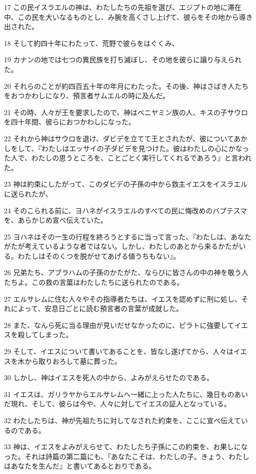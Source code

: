 \par 17 この民イスラエルの神は、わたしたちの先祖を選び、エジプトの地に滞在中、この民を大いなるものとし、み腕を高くさし上げて、彼らをその地から導き出された。
\par 18 そして約四十年にわたって、荒野で彼らをはぐくみ、
\par 19 カナンの地では七つの異民族を打ち滅ぼし、その地を彼らに譲り与えられた。
\par 20 それらのことが約四百五十年の年月にわたった。その後、神はさばき人たちをおつかわしになり、預言者サムエルの時に及んだ。
\par 21 その時、人々が王を要求したので、神はベニヤミン族の人、キスの子サウロを四十年間、彼らにおつかわしになった。
\par 22 それから神はサウロを退け、ダビデを立てて王とされたが、彼についてあかしをして、『わたしはエッサイの子ダビデを見つけた。彼はわたしの心にかなった人で、わたしの思うところを、ことごとく実行してくれるであろう』と言われた。
\par 23 神は約束にしたがって、このダビデの子孫の中から救主イエスをイスラエルに送られたが、
\par 24 そのこられる前に、ヨハネがイスラエルのすべての民に悔改めのバプテスマを、あらかじめ宣べ伝えていた。
\par 25 ヨハネはその一生の行程を終ろうとするに当って言った、『わたしは、あなたがたが考えているような者ではない。しかし、わたしのあとから来るかたがいる。わたしはそのくつを脱がせてあげる値うちもない』。
\par 26 兄弟たち、アブラハムの子孫のかたがた、ならびに皆さんの中の神を敬う人たちよ。この救の言葉はわたしたちに送られたのである。
\par 27 エルサレムに住む人々やその指導者たちは、イエスを認めずに刑に処し、それによって、安息日ごとに読む預言者の言葉が成就した。
\par 28 また、なんら死に当る理由が見いだせなかったのに、ピラトに強要してイエスを殺してしまった。
\par 29 そして、イエスについて書いてあることを、皆なし遂げてから、人々はイエスを木から取りおろして墓に葬った。
\par 30 しかし、神はイエスを死人の中から、よみがえらせたのである。
\par 31 イエスは、ガリラヤからエルサレムへ一緒に上った人たちに、幾日ものあいだ現れ、そして、彼らは今や、人々に対してイエスの証人となっている。
\par 32 わたしたちは、神が先祖たちに対してなされた約束を、ここに宣べ伝えているのである。
\par 33 神は、イエスをよみがえらせて、わたしたち子孫にこの約束を、お果しになった。それは詩篇の第二篇にも、『あなたこそは、わたしの子。きょう、わたしはあなたを生んだ』と書いてあるとおりである。
